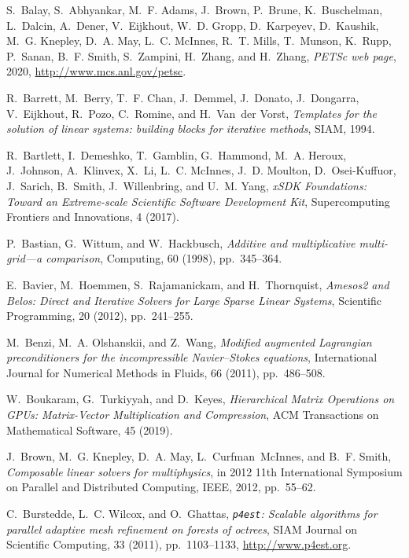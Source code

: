 \documentclass[3p,11pt]{elsarticle}
\begin{document}
\begin{thebibliography}{10}
{\sc S.~Balay, S.~Abhyankar, M.~F. Adams, J.~Brown, P.~Brune, K.~Buschelman,
  L.~Dalcin, A.~Dener, V.~Eijkhout, W.~D. Gropp, D.~Karpeyev, D.~Kaushik, M.~G.
  Knepley, D.~A. May, L.~C. McInnes, R.~T. Mills, T.~Munson, K.~Rupp, P.~Sanan,
  B.~F. Smith, S.~Zampini, H.~Zhang, and H.~Zhang}, {\em {PETS}c web page},
  2020, \url{http://www.mcs.anl.gov/petsc}.

{\sc R.~Barrett, M.~Berry, T.~F. Chan, J.~Demmel, J.~Donato, J.~Dongarra,
  V.~Eijkhout, R.~Pozo, C.~Romine, and H.~Van~der Vorst}, {\em Templates for
  the solution of linear systems: building blocks for iterative methods}, SIAM,
  1994.

{\sc R.~Bartlett, I.~Demeshko, T.~Gamblin, G.~Hammond, M.~A. Heroux,
  J.~Johnson, A.~Klinvex, X.~Li, L.~C. McInnes, J.~D. Moulton, D.~Osei-Kuffuor,
  J.~Sarich, B.~Smith, J.~Willenbring, and U.~M. Yang}, {\em {xSDK Foundations:
  Toward an Extreme-scale Scientific Software Development Kit}}, Supercomputing
  Frontiers and Innovations, 4 (2017).

{\sc P.~Bastian, G.~Wittum, and W.~Hackbusch}, {\em Additive and multiplicative
  multi-grid—a comparison}, Computing, 60 (1998), pp.~345--364.

{\sc E.~Bavier, M.~Hoemmen, S.~Rajamanickam, and H.~Thornquist}, {\em {Amesos2
  and Belos: Direct and Iterative Solvers for Large Sparse Linear Systems}},
  Scientific Programming, 20 (2012), pp.~241--255.

{\sc M.~Benzi, M.~A. Olshanskii, and Z.~Wang}, {\em {Modified augmented
  Lagrangian preconditioners for the incompressible Navier--Stokes equations}},
  International Journal for Numerical Methods in Fluids, 66 (2011),
  pp.~486--508.

{\sc W.~Boukaram, G.~Turkiyyah, and D.~Keyes}, {\em {Hierarchical Matrix
  Operations on GPUs: Matrix-Vector Multiplication and Compression}}, ACM
  Transactions on Mathematical Software, 45 (2019).

{\sc J.~Brown, M.~G. Knepley, D.~A. May, L.~Curfman~McInnes, and B.~F. Smith},
  {\em Composable linear solvers for multiphysics}, in 2012 11th International
  Symposium on Parallel and Distributed Computing, IEEE, 2012, pp.~55--62.

{\sc C.~Burstedde, L.~C. Wilcox, and O.~Ghattas}, {\em {\texttt{p4est}}:
  Scalable algorithms for parallel adaptive mesh refinement on forests of
  octrees}, SIAM Journal on Scientific Computing, 33 (2011), pp.~1103--1133,
  \url{http://www.p4est.org}.


\end{thebibliography}
\end{document}
